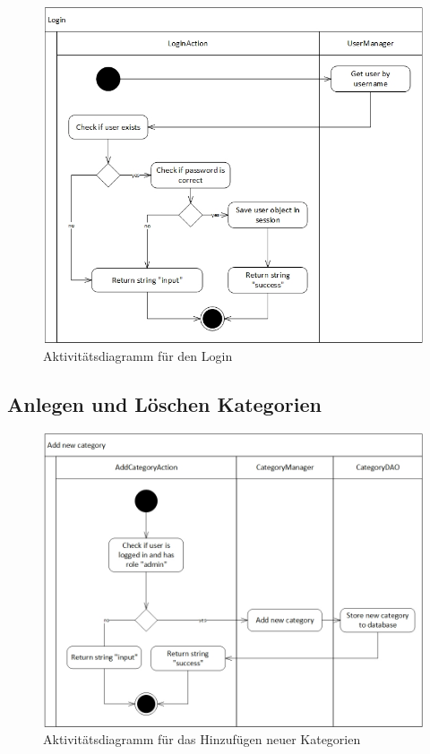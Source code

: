 \documentclass[12pt,a4paper]{article}
\begin{document}
	\begin{figure}[H]
		\centering
		\includegraphics[scale=0.5]{diagrams/LoginAction_activity.jpg}
		\caption{Aktivitätsdiagramm für den Login}
	\end{figure}
	
	\subsection{Anlegen und Löschen Kategorien}
	\begin{figure}[H]
		\centering
		\includegraphics[scale=0.5]{diagrams/AddCategoryAction_activity.jpg}
		\caption{Aktivitätsdiagramm für das Hinzufügen neuer Kategorien}
	\end{figure}
\end{document}
